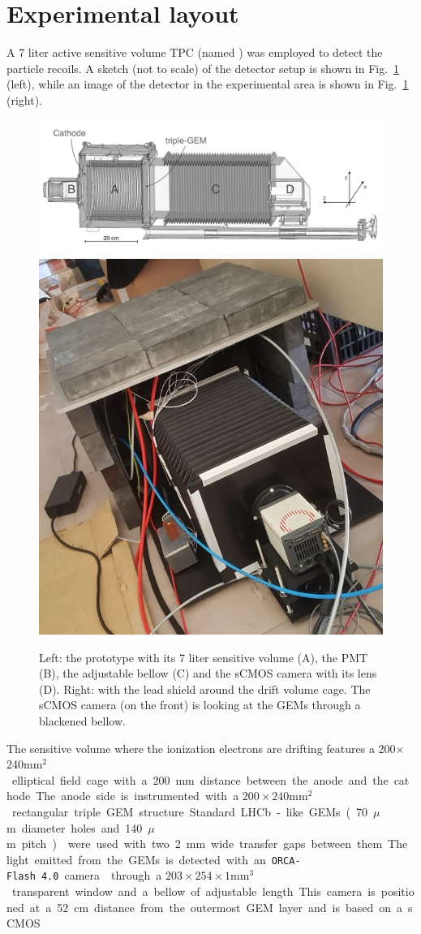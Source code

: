 \documentclass[12pt]{iopart}
\begin{document}
\section{Experimental layout}
\label{sec:layout}
A 7 liter active sensitive volume TPC (named \lemon) was employed to
detect the particle recoils. A sketch (not to scale) of the detector
setup is shown in Fig.~\ref{fig:lemon} (left), while an image of the
detector in the experimental area is shown in Fig.~\ref{fig:lemon}
(right).
% 
\begin{figure}[ht]
	\centering
	\includegraphics[width=0.70\linewidth]{figures/lemon.png}
        \includegraphics[width=0.20\linewidth]{LEMON-Shielded.jpg}
  	\caption{Left: the \lemon prototype with  its 7 liter sensitive
          volume (A), the PMT (B), the adjustable bellow (C) and the
          sCMOS camera with its lens (D). Right: \lemon
          with the lead shield around the drift volume cage. The sCMOS
          camera (on the front) is looking at the GEMs through a
          blackened bellow.
  	\label{fig:lemon}}
\end{figure}
%
The sensitive volume where the ionization electrons are drifting
features a 200$\times$240\unit{mm$^2$} elliptical field cage with a
200 mm distance between the anode and the cathode. The anode side is
instrumented with a $200{\times}240$\unit{mm$^2$} rectangular triple
GEM structure.  Standard LHCb-like GEMs (70\unit{$\mu$m} diameter
holes and 140\unit{$\mu$m} pitch)~\cite{bib:thesis} were used with two
2\unit{mm} wide transfer gaps between them. The light emitted from the
GEMs is detected with an \texttt{ORCA-Flash~4.0} camera \cite{ORCAcamera}
through a $203{\times}254{\times}1$\unit{mm$^3$} transparent window
and a bellow of adjustable length.  This camera is positioned at a 52
cm distance from the outermost GEM layer and is based on a sCMOS
\end{document}
